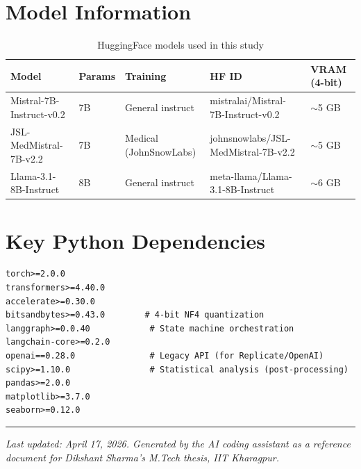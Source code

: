 \documentclass[12pt, a4paper]{article}
\begin{document}
\appendix
\section{Model Information}

\begin{table}[H]
\centering
\caption{HuggingFace models used in this study}
\begin{tabular}{@{}lllll@{}}
\toprule
\textbf{Model} & \textbf{Params} & \textbf{Training} & \textbf{HF ID} & \textbf{VRAM (4-bit)} \\
\midrule
Mistral-7B-Instruct-v0.2 & 7B & General instruct & mistralai/Mistral-7B-Instruct-v0.2 & $\sim$5 GB \\
JSL-MedMistral-7B-v2.2   & 7B & Medical (JohnSnowLabs) & johnsnowlabs/JSL-MedMistral-7B-v2.2 & $\sim$5 GB \\
Llama-3.1-8B-Instruct    & 8B & General instruct & meta-llama/Llama-3.1-8B-Instruct & $\sim$6 GB \\
\bottomrule
\end{tabular}
\end{table}

\section{Key Python Dependencies}

\begin{lstlisting}[style=bashstyle]
torch>=2.0.0
transformers>=4.40.0
accelerate>=0.30.0
bitsandbytes>=0.43.0        # 4-bit NF4 quantization
langgraph>=0.0.40            # State machine orchestration
langchain-core>=0.2.0
openai==0.28.0               # Legacy API (for Replicate/OpenAI)
scipy>=1.10.0                # Statistical analysis (post-processing)
pandas>=2.0.0
matplotlib>=3.7.0
seaborn>=0.12.0
\end{lstlisting}

\vspace{2em}
\hrule
\vspace{0.5em}
\noindent\textit{Last updated: April 17, 2026. Generated by the AI coding assistant as a reference document for Dikshant Sharma's M.Tech thesis, IIT Kharagpur.}
\end{document}
